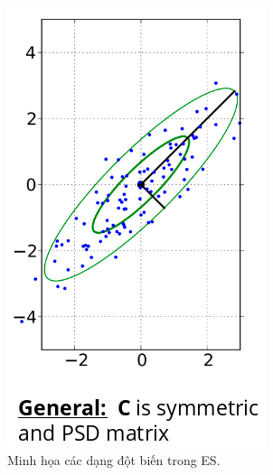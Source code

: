 \documentclass{book}
\begin{document}
\begin{itemize}
\begin{figure}[H]
\begin{minipage}[c]{0.3\textwidth}
            \includegraphics[width=\textwidth]{images/general_mutation.png}
        \end{minipage}
        \caption{Minh họa các dạng đột biến trong ES.}
        \label{fig:mutation_types}
    \end{figure}
\end{itemize}
\end{document}

